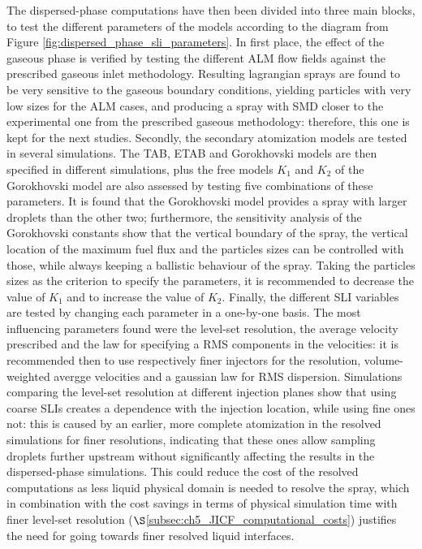 The dispersed-phase computations have then been divided into three main blocks, to test the different parameters of the models according to the diagram from Figure \ref{fig:dispersed_phase_sli_parameters}. In first place, the effect of the gaseous phase is verified by testing the different ALM flow fields against the prescribed gaseous inlet methodology. Resulting lagrangian sprays are found to be very sensitive to the gaseous boundary conditions, yielding particles with very low sizes for the ALM cases, and producing a spray with SMD closer to the experimental one from the prescribed gaseous methodology: therefore, this one is kept for the next studies. Secondly, the secondary atomization models are tested in several simulations. The TAB, ETAB and Gorokhovski models are then specified in different simulations, plus the free models $K_1$ and $K_2$ of the Gorokhovski model are also assessed by testing five combinations of these parameters. It is found that the Gorokhovski model provides a spray with larger droplets than the other two; furthermore, the sensitivity analysis of the Gorokhovski constants show that the vertical boundary of the spray, the vertical location of the maximum fuel flux and the particles sizes can be controlled with those, while always keeping a ballistic behaviour of the spray. Taking the particles sizes as the criterion to specify the parameters, it is recommended to decrease the value of $K_1$ and to increase the value of $K_2$. Finally, the different SLI variables are tested by changing each parameter in a one-by-one basis. The most influencing parameters found were the level-set resolution, the average velocity prescribed and the law for specifying a RMS components in the velocities: it is recommended then to use respectively finer injectors for the resolution, volume-weighted avergge velocities and a gaussian law for RMS dispersion. Simulations comparing the level-set resolution at different injection planes show that using coarse SLIs creates a dependence with the injection location, while using fine ones not: this is caused by an earlier, more complete atomization in the resolved simulations for finer resolutions, indicating that these ones allow sampling droplets further upstream without significantly affecting the results in the dispersed-phase simulations. This could reduce the cost of the resolved computations as less liquid physical domain is needed to resolve the spray, which in combination with the cost savings in terms of physical simulation time with finer level-set resolution ($\S$\ref{subsec:ch5_JICF_computational_costs}) justifies the need for going towards finer resolved liquid interfaces. 

